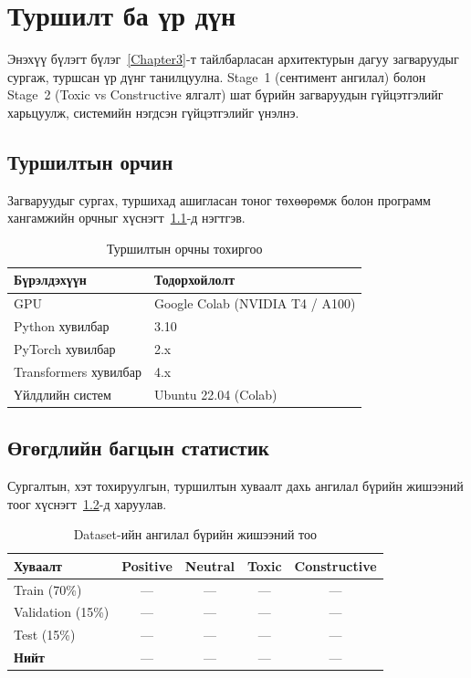 
\chapter{Туршилт ба үр дүн}
\label{Chapter4}

Энэхүү бүлэгт бүлэг~\ref{Chapter3}-т тайлбарласан архитектурын дагуу загваруудыг
сургаж, туршсан үр дүнг танилцуулна. Stage~1 (сентимент ангилал) болон Stage~2
(Toxic vs Constructive ялгалт) шат бүрийн загваруудын гүйцэтгэлийг
харьцуулж, системийн нэгдсэн гүйцэтгэлийг үнэлнэ.

\section{Туршилтын орчин}

Загваруудыг сургах, туршихад ашигласан тоног төхөөрөмж болон программ хангамжийн
орчныг хүснэгт~\ref{tab:env}-д нэгтгэв.

\begin{table}[H]
\centering
\caption{Туршилтын орчны тохиргоо}
\label{tab:env}
\begin{tabular}{@{}ll@{}}
\toprule
\textbf{Бүрэлдэхүүн} & \textbf{Тодорхойлолт} \\
\midrule
GPU                   & Google Colab (NVIDIA T4 / A100) \\
Python хувилбар       & 3.10 \\
PyTorch хувилбар      & 2.x \\
Transformers хувилбар & 4.x \\
Үйлдлийн систем       & Ubuntu 22.04 (Colab) \\
\bottomrule
\end{tabular}
\end{table}

\section{Өгөгдлийн багцын статистик}

Сургалтын, хэт тохируулгын, туршилтын хуваалт дахь ангилал бүрийн жишээний тоог
хүснэгт~\ref{tab:data-stats}-д харуулав.

\begin{table}[H]
\centering
\caption{Dataset-ийн ангилал бүрийн жишээний тоо}
\label{tab:data-stats}
\begin{tabular}{@{}lcccc@{}}
\toprule
\textbf{Хуваалт} & \textbf{Positive} & \textbf{Neutral} & \textbf{Toxic} & \textbf{Constructive} \\
\midrule
Train (70\%)      & ---  & ---  & ---  & --- \\
Validation (15\%) & ---  & ---  & ---  & --- \\
Test (15\%)       & ---  & ---  & ---  & --- \\
\midrule
\textbf{Нийт}     & ---  & ---  & ---  & --- \\
\bottomrule
\end{tabular}
\end{table}

